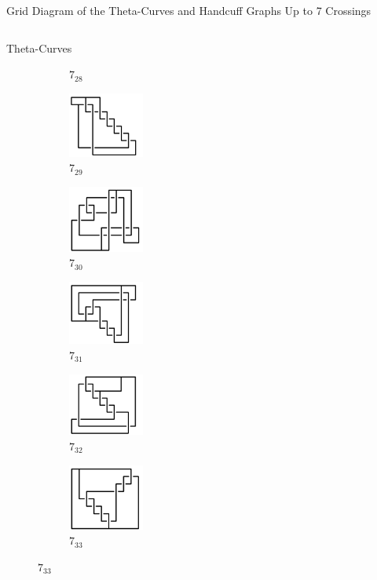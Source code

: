 \documentclass[final]{beamer}
\begin{document}
\begin{frame}[t]
\begin{alertblock}{Grid Diagram of the Theta-Curves and Handcuff Graphs Up to 7 Crossings}
\begin{columns}[t]
\begin{column}{0.7\textwidth}
\begin{alertblock}{Theta-Curves}
\begin{figure}
\begin{subfigure}{0.075\textwidth}
    \caption{$7_{28}$} 
    \end{subfigure}
    \begin{subfigure}{0.075\textwidth}
    \includegraphics[width=2.5cm]{../Midterm_Poster/grid_diagram/theta_7_29.png}
    \caption{$7_{29}$} 
    \end{subfigure}
    \begin{subfigure}{0.075\textwidth}
    \includegraphics[width=2.5cm]{../Midterm_Poster/grid_diagram/theta_7_30.png}
    \caption{$7_{30}$}
    \end{subfigure}
    \begin{subfigure}{0.075\textwidth}
    \includegraphics[width=2.5cm]{../Midterm_Poster/grid_diagram/theta_7_31.png}
    \caption{$7_{31}$} 
    \end{subfigure}
    \begin{subfigure}{0.075\textwidth}
    \includegraphics[width=2.5cm]{../Midterm_Poster/grid_diagram/theta_7_32.png}
    \caption{$7_{32}$} 
    \end{subfigure}
    \begin{subfigure}{0.075\textwidth}
    \includegraphics[width=2.5cm]{../Midterm_Poster/grid_diagram/theta_7_33.png}
    \caption{$7_{33}$} 
    \end{subfigure}

\end{figure}
\end{alertblock}
\end{column}
\end{columns}
\end{alertblock}
\end{frame}
\end{document}

